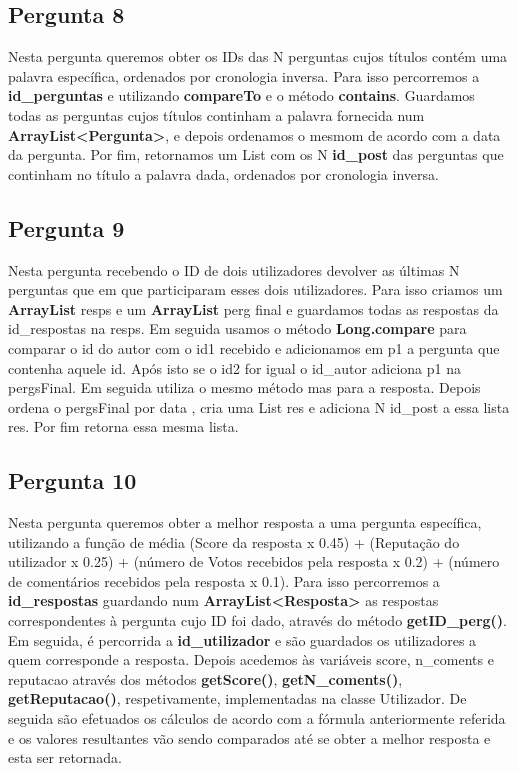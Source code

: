 \documentclass[a4paper]{article}
\begin{document}
	\subsection{Pergunta 8}
		Nesta pergunta queremos obter os IDs das N perguntas cujos títulos contém uma palavra específica, ordenados por cronologia inversa. Para isso percorremos a \textbf{id_perguntas} e utilizando \textbf{compareTo} e o método \textbf{contains}. Guardamos todas as perguntas cujos títulos continham a palavra fornecida num \textbf{ArrayList<Pergunta>}, e depois ordenamos o mesmom de acordo com a data da pergunta. Por fim, retornamos um List com os N \textbf{id_post} das perguntas que continham no título a palavra dada, ordenados por cronologia inversa.

	\subsection{Pergunta 9}
		Nesta pergunta recebendo o ID de dois utilizadores devolver as últimas N perguntas que em que participaram esses dois utilizadores.
		Para isso criamos um \textbf{ArrayList} resps e um \textbf{ArrayList} perg final e guardamos todas as respostas da id_respostas na resps. Em seguida usamos o método \textbf{Long.compare} para comparar o id do autor com o id1 recebido e adicionamos em p1 a pergunta que contenha aquele id. Após isto se o id2 for igual o id_autor adiciona p1 na pergsFinal. Em seguida utiliza o mesmo método mas para a resposta. Depois ordena o pergsFinal por data , cria uma List res e adiciona N id_post a essa lista res. Por fim retorna essa mesma lista.
	\subsection{Pergunta 10}
		Nesta pergunta queremos obter a melhor resposta a uma pergunta específica, utilizando a função de média (Score da resposta x 0.45) + (Reputação do utilizador x 0.25) + (número de Votos recebidos pela resposta x 0.2) + (número de comentários recebidos pela resposta x 0.1). Para isso percorremos a \textbf{id_respostas} guardando num \textbf{ArrayList<Resposta>} as respostas correspondentes à pergunta cujo ID foi dado, através do método \textbf{getID_perg()}. Em seguida, é percorrida a \textbf{id_utilizador} e são guardados os utilizadores a quem corresponde a resposta. Depois acedemos às variáveis score, n_coments e reputacao através dos métodos \textbf{getScore()}, \textbf{getN_coments()}, \textbf{getReputacao()}, respetivamente, implementadas na classe Utilizador. De seguida são efetuados os cálculos de acordo com a fórmula anteriormente referida e os valores resultantes vão sendo comparados até se obter a melhor resposta e esta ser retornada.
\end{document}
